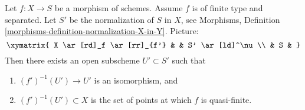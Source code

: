 \begin{lemma}
\label{lemma-finite-type-separated}
Let $f : X \to S$ be a morphism of schemes.
Assume $f$ is of finite type and separated.
Let $S'$ be the normalization of $S$ in $X$, see
Morphisms, Definition \ref{morphisms-definition-normalization-X-in-Y}.
Picture:
$$
\xymatrix{
X \ar[rd]_f \ar[rr]_{f'} & & S' \ar[ld]^\nu \\
& S &
}
$$
Then there exists an open subscheme $U' \subset S'$ such that
\begin{enumerate}
\item $(f')^{-1}(U') \to U'$ is an isomorphism, and
\item $(f')^{-1}(U') \subset X$ is the set of points at which
$f$ is quasi-finite.
\end{enumerate}
\end{lemma}

